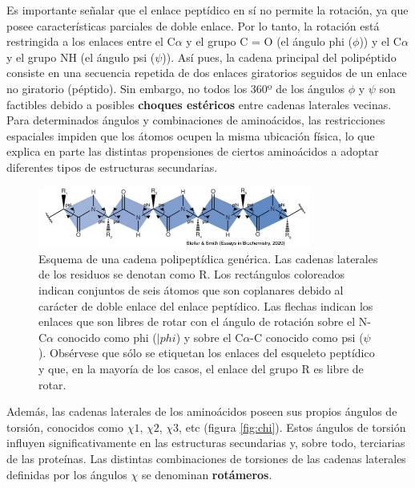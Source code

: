 Es importante señalar que el enlace peptídico en sí no permite la rotación, ya que posee características parciales de doble enlace. Por lo tanto, la rotación está restringida a los enlaces entre el C$\alpha$ y el grupo C = O (el ángulo phi ($\phi$)) y el C$\alpha$ y el grupo NH (el ángulo psi ($\psi$)). Así pues, la cadena principal del polipéptido consiste en una secuencia repetida de dos enlaces giratorios seguidos de un enlace no giratorio (péptido). Sin embargo, no todos los 360º de los ángulos $\phi$ y $\psi$ son factibles debido a posibles \textbf{choques estéricos} entre cadenas laterales vecinas. Para determinados ángulos y combinaciones de aminoácidos, las restricciones espaciales impiden que los átomos ocupen la misma ubicación física, lo que explica en parte las distintas propensiones de ciertos aminoácidos a adoptar diferentes tipos de estructuras secundarias. 

\begin{figure}[h]
\centering
\includegraphics[width = 0.8\textwidth]{figs/peptide_bond.png}
\caption{Esquema de una cadena polipeptídica genérica. Las cadenas laterales de los residuos se denotan como R. Los rectángulos coloreados indican conjuntos de seis átomos que son coplanares debido al carácter de doble enlace del enlace peptídico. Las flechas indican los enlaces que son libres de rotar con el ángulo de rotación sobre el N-C$\alpha$ conocido como phi ($|phi$) y sobre el C$\alpha$-C conocido como psi ($\psi$). Obsérvese que sólo se etiquetan los enlaces del esqueleto peptídico y que, en la mayoría de los casos, el enlace del grupo R es libre de rotar.}
\end{figure}

Además, las cadenas laterales de los aminoácidos poseen sus propios ángulos de torsión, conocidos como $\chi1$, $\chi2$, $\chi3$, etc (figura \ref{fig:chi}). Estos ángulos de torsión influyen significativamente en las estructuras secundarias y, sobre todo, terciarias de las proteínas. Las distintas combinaciones de torsiones de las cadenas laterales definidas por los ángulos $\chi$ se denominan \textbf{rotámeros}.


